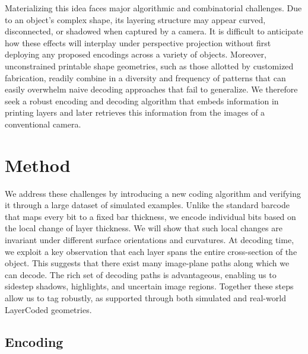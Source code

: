 \documentclass[12pt]{report}
\begin{document}
Materializing this idea faces major algorithmic and combinatorial challenges.
Due to an object's complex shape, 
its layering structure may appear curved, disconnected, 
or shadowed when captured by a camera. 
It is difficult to anticipate how these effects will interplay under perspective projection
without first deploying any proposed encodings across a variety of objects.
Moreover, unconstrained printable shape geometries, 
such as those allotted by customized fabrication,
readily combine in a diversity and frequency of patterns 
that can easily overwhelm naive decoding approaches that fail to generalize.
We therefore seek a robust encoding and decoding algorithm 
that embeds information in printing layers and 
later retrieves this information from the images of a conventional camera.

\section{Method}\label{sec:layercode_method}

We address these challenges by introducing a new coding algorithm and 
verifying it through a large dataset of simulated examples.
Unlike the standard barcode that maps every bit to a fixed bar thickness, 
we encode individual bits based on the local change of layer thickness.
We will show that such local changes are invariant 
under different surface orientations and curvatures.
At decoding time, we exploit a key observation 
that each layer spans the entire cross-section of the object. 
This suggests that there exist many image-plane paths along which we can decode. 
The rich set of decoding paths is advantageous,
enabling us to sidestep shadows, highlights, and uncertain image regions.
Together these steps allow us to tag robustly, 
as supported through both simulated and real-world LayerCoded geometries.

\subsection{Encoding}\label{sec:layercode_encode}

\end{document}
